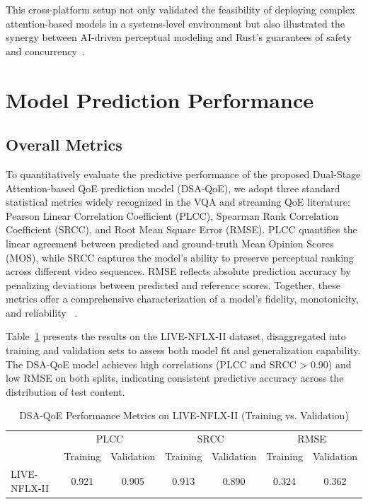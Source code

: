 This cross-platform setup not only validated the feasibility of deploying complex attention-based models in a systems-level environment but also illustrated the synergy between AI-driven perceptual modeling and Rust's guarantees of safety and concurrency~\cite{fulton2022benefits,carnelos2025microflow}.

\section{Model Prediction Performance}

\subsection{Overall Metrics}

To quantitatively evaluate the predictive performance of the proposed Dual-Stage Attention-based QoE prediction model (DSA-QoE), 
we adopt three standard statistical metrics widely recognized in the VQA and streaming QoE literature: Pearson Linear Correlation Coefficient (PLCC), 
Spearman Rank Correlation Coefficient (SRCC), and Root Mean Square Error (RMSE). PLCC quantifies the linear agreement between predicted and ground-truth 
Mean Opinion Scores (MOS), while SRCC captures the model's ability to preserve perceptual ranking across different video sequences. RMSE reflects absolute 
prediction accuracy by penalizing deviations between predicted and reference scores. Together, these metrics offer a comprehensive characterization of a model's fidelity, 
monotonicity, and reliability ~\cite{sheikh2006statistical, mittal2012vbed}.

Table~\ref{tab:overall_metrics} presents the results on the LIVE-NFLX-II dataset, disaggregated into training and validation sets to assess both model fit and 
generalization capability. The DSA-QoE model achieves high correlations (PLCC and SRCC > 0.90) and low RMSE on both splits, indicating consistent predictive accuracy 
across the distribution of test content.

\begin{table}[h]
    \centering
    \caption{DSA-QoE Performance Metrics on LIVE-NFLX-II (Training vs. Validation)}
    \label{tab:overall_metrics}
    \begin{tabular}{lcccccc}
        \toprule
        & \multicolumn{2}{c}{PLCC} & \multicolumn{2}{c}{SRCC} & \multicolumn{2}{c}{RMSE} \\
        \cmidrule(lr){2-3} \cmidrule(lr){4-5} \cmidrule(lr){6-7}
        & Training & Validation & Training & Validation & Training & Validation \\
        \midrule
        LIVE-NFLX-II & 0.921 & 0.905 & 0.913 & 0.890 & 0.324 & 0.362 \\
        \bottomrule
    \end{tabular}
\end{table}

